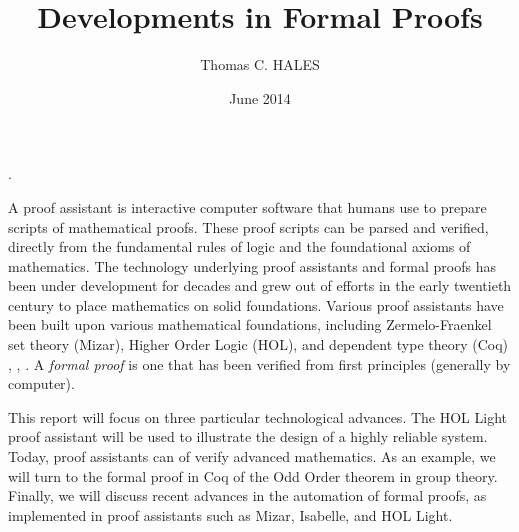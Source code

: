 \documentclass[brochure,english,12pt]{bourbaki}
\date{June 2014}
\title{Developments in Formal Proofs}
\author{Thomas C. HALES}
\theoremstyle{plain}
\begin{document}
\maketitle



{

. %




}

\bigskip



A proof assistant is interactive computer software that humans use to prepare scripts of mathematical proofs.
These proof scripts can be parsed and verified, directly from
the fundamental rules of logic and the foundational axioms of mathematics.  
The
technology underlying proof assistants and formal proofs has been under development for decades and grew out
of efforts in the early twentieth century to place mathematics on solid foundations.
Various proof assistants have been built upon various mathematical foundations, including
Zermelo-Fraenkel set theory (Mizar), Higher Order Logic (HOL), and dependent type theory (Coq)
\cite{Mizar}, \cite{HOLL}, \cite{Coq}.
A {\it formal proof} is one that has been verified from first principles (generally by computer).  


This report
will focus on three  particular technological advances.
The HOL Light proof assistant will be used to illustrate the design of a highly reliable system.
Today, proof assistants can of verify advanced 
mathematics.    As an example, we will
turn to the formal proof in Coq of the Odd Order theorem in group theory.
Finally, we will discuss recent advances in the automation of formal proofs, as implemented in proof assistants
such as Mizar, Isabelle, and HOL Light.

\end{document}
